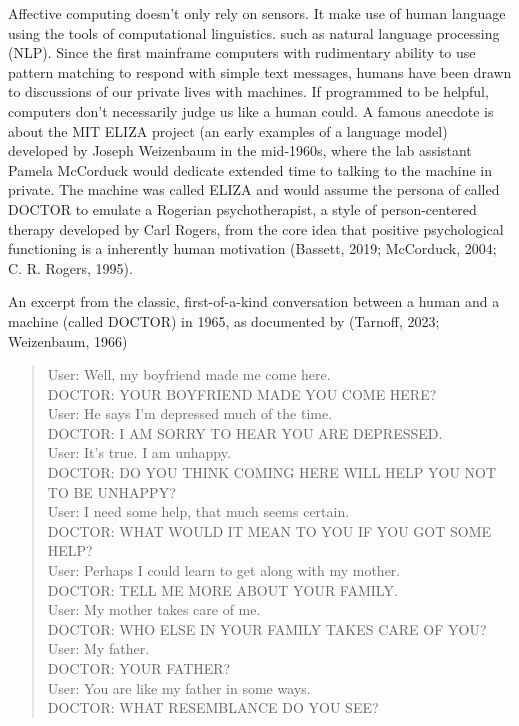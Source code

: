 \documentclass[
  letterpaper,
  DIV=11,
  numbers=noendperiod]{scrartcl}
\begin{document}
Affective computing doesn't only rely on sensors. It make use of human
language using the tools of computational linguistics. such as natural
language processing (NLP). Since the first mainframe computers with
rudimentary ability to use pattern matching to respond with simple text
messages, humans have been drawn to discussions of our private lives
with machines. If programmed to be helpful, computers don't necessarily
judge us like a human could. A famous anecdote is about the MIT ELIZA
project (an early examples of a language model) developed by Joseph
Weizenbaum in the mid-1960s, where the lab assistant Pamela McCorduck
would dedicate extended time to talking to the machine in private. The
machine was called ELIZA and would assume the persona of called DOCTOR
to emulate a Rogerian psychotherapist, a style of person-centered
therapy developed by Carl Rogers, from the core idea that positive
psychological functioning is a inherently human motivation (Bassett,
2019; McCorduck, 2004; C. R. Rogers, 1995).

An excerpt from the classic, first-of-a-kind conversation between a
human and a machine (called DOCTOR) in 1965, as documented by (Tarnoff,
2023; Weizenbaum, 1966)

\begin{quote}
User: Well, my boyfriend made me come here.\\
DOCTOR: YOUR BOYFRIEND MADE YOU COME HERE?\\
User: He says I'm depressed much of the time.\\
DOCTOR: I AM SORRY TO HEAR YOU ARE DEPRESSED.\\
User: It's true. I am unhappy.\\
DOCTOR: DO YOU THINK COMING HERE WILL HELP YOU NOT TO BE UNHAPPY?\\
User: I need some help, that much seems certain.\\
DOCTOR: WHAT WOULD IT MEAN TO YOU IF YOU GOT SOME HELP?\\
User: Perhaps I could learn to get along with my mother.\\
DOCTOR: TELL ME MORE ABOUT YOUR FAMILY.\\
User: My mother takes care of me.\\
DOCTOR: WHO ELSE IN YOUR FAMILY TAKES CARE OF YOU?\\
User: My father.\\
DOCTOR: YOUR FATHER?\\
User: You are like my father in some ways.\\
DOCTOR: WHAT RESEMBLANCE DO YOU SEE?
\end{quote}
\end{document}
